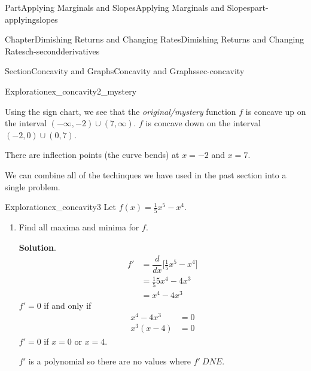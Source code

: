 \documentclass{tufte-book}
\newcommand{\blocktitlefont}{\relax}
\numberwithin{equation}{chapter}
\newcommand{\ddx}[1]{ \dfrac{d}{dx} \Big[ #1 \Big]  }
\newcommand{\amp}{&}
\begin{document}
\begin{partptx}{Part}{Applying Marginals and Slopes}{}{Applying Marginals and Slopes}{}{}{part-applyingslopes}
\begin{chapterptx}{Chapter}{Dimishing Returns and Changing Rates}{}{Dimishing Returns and Changing Rates}{}{}{ch-secondderivatives}
\begin{sectionptx}{Section}{Concavity and Graphs}{}{Concavity and Graphs}{}{}{sec-concavity}
\begin{exploration}{Exploration}{}{ex_concavity2_mystery}
\begin{enumerate}[font=\bfseries,label=(\alph*),ref=\alph*]
\begin{image}{0.125}{0.75}{0.125}{}
{
}%
\end{image}%
%
\par
Using the sign chart, we see that the \emph{original\slash{}mystery} function \(f\) is concave up on the interval \((-\infty,-2)\cup(7,\infty)\).  \(f\) is concave down on the interval \((-2,0)\cup(0,7)\).%
\par
There are inflection points (the curve bends) at \(x=-2\) and \(x=7\).%
\end{enumerate}%
\end{exploration}%
We can combine all of the techinques we have used in the past section into a single problem.%
\begin{exploration}{Exploration}{}{ex_concavity3}%
Let \(f(x) = \frac{1}{5}x^5 - x^4\).%
\begin{enumerate}[font=\bfseries,label=(\alph*),ref=\alph*]%
\item{}Find all maxima and minima for \(f\).%
\par\smallskip%
\noindent\textbf{\blocktitlefont Solution}.\hypertarget{ex_concavity3-2-2}{}\quad{}%
\begin{align*}
f' \amp = \ddx{ \frac{1}{5}x^5 - x^4}\\
\amp = \frac{1}{5}5x^4 - 4x^3\\
\amp = x^4 - 4x^3
\end{align*}
\(f'=0\) if and only if%
\begin{align*}
x^4-4x^3 \amp =0\\
x^3(x-4) \amp =0
\end{align*}
\(f'=0\) if \(x=0\) or \(x=4\).%
\par
\(f'\) is a polynomial so there are no values where \(f'\ DNE\). \begin{image}{0.25}{0.5}{0.25}{}%
\end{image}
\end{enumerate}
\end{exploration}
\end{sectionptx}
\end{chapterptx}
\end{partptx}
\end{document}
